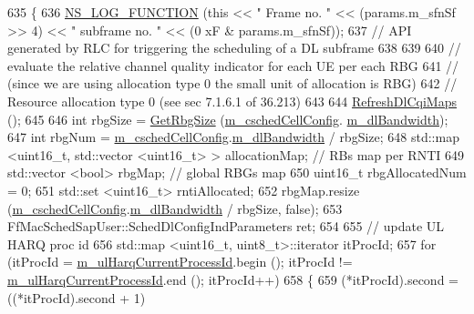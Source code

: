\begin{DoxyCode}
635 \{
636   \hyperlink{log-macros-disabled_8h_a90b90d5bad1f39cb1b64923ea94c0761}{NS\_LOG\_FUNCTION} (\textcolor{keyword}{this} << \textcolor{stringliteral}{" Frame no. "} << (params.m\_sfnSf >> 4) << \textcolor{stringliteral}{" subframe no. "} << (0
      xF & params.m\_sfnSf));
637   \textcolor{comment}{// API generated by RLC for triggering the scheduling of a DL subframe}
638 
639 
640   \textcolor{comment}{// evaluate the relative channel quality indicator for each UE per each RBG}
641   \textcolor{comment}{// (since we are using allocation type 0 the small unit of allocation is RBG)}
642   \textcolor{comment}{// Resource allocation type 0 (see sec 7.1.6.1 of 36.213)}
643 
644   \hyperlink{classns3_1_1FdMtFfMacScheduler_abc1c125204aef44b0b32e7fbed0b1aae}{RefreshDlCqiMaps} ();
645 
646   \textcolor{keywordtype}{int} rbgSize = \hyperlink{classns3_1_1FdMtFfMacScheduler_a40c1df098595fc796978777a91ca284a}{GetRbgSize} (\hyperlink{classns3_1_1FdMtFfMacScheduler_a9f2e3c6bfae8bfc266a84f64e5937ac8}{m\_cschedCellConfig}.
      \hyperlink{structns3_1_1FfMacCschedSapProvider_1_1CschedCellConfigReqParameters_ad18c695bd3c9d7f742ba1dab4a941e8a}{m\_dlBandwidth});
647   \textcolor{keywordtype}{int} rbgNum = \hyperlink{classns3_1_1FdMtFfMacScheduler_a9f2e3c6bfae8bfc266a84f64e5937ac8}{m\_cschedCellConfig}.\hyperlink{structns3_1_1FfMacCschedSapProvider_1_1CschedCellConfigReqParameters_ad18c695bd3c9d7f742ba1dab4a941e8a}{m\_dlBandwidth} / rbgSize;
648   std::map <uint16\_t, std::vector <uint16\_t> > allocationMap; \textcolor{comment}{// RBs map per RNTI}
649   std::vector <bool> rbgMap;  \textcolor{comment}{// global RBGs map}
650   uint16\_t rbgAllocatedNum = 0;
651   std::set <uint16\_t> rntiAllocated;
652   rbgMap.resize (\hyperlink{classns3_1_1FdMtFfMacScheduler_a9f2e3c6bfae8bfc266a84f64e5937ac8}{m\_cschedCellConfig}.\hyperlink{structns3_1_1FfMacCschedSapProvider_1_1CschedCellConfigReqParameters_ad18c695bd3c9d7f742ba1dab4a941e8a}{m\_dlBandwidth} / rbgSize, \textcolor{keyword}{false});
653   FfMacSchedSapUser::SchedDlConfigIndParameters ret;
654 
655   \textcolor{comment}{//   update UL HARQ proc id}
656   std::map <uint16\_t, uint8\_t>::iterator itProcId;
657   \textcolor{keywordflow}{for} (itProcId = \hyperlink{classns3_1_1FdMtFfMacScheduler_abdac9ae7be0c9b938eebf34dfb2f5126}{m\_ulHarqCurrentProcessId}.begin (); itProcId != 
      \hyperlink{classns3_1_1FdMtFfMacScheduler_abdac9ae7be0c9b938eebf34dfb2f5126}{m\_ulHarqCurrentProcessId}.end (); itProcId++)
658     \{
659       (*itProcId).second = ((*itProcId).second + 1) %

\end{DoxyCode}
